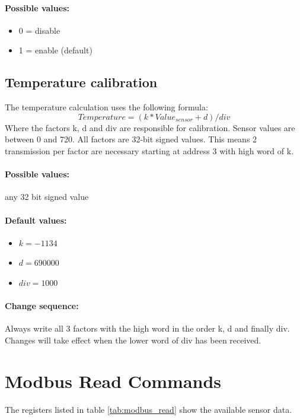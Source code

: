 \paragraph{Possible values:}
\begin{itemize}
    \item 0 = disable
    \item 1 = enable (default)
\end{itemize}

\subsection{Temperature calibration}
The temperature calculation uses the following formula:
\[
Temperature = (k * Value_{sensor} + d) / div
\]
Where the factors k, d and div are responsible for calibration. Sensor values are between 0 and 720. All factors are 32-bit signed values. This means 2 transmission per factor are necessary starting at address 3 with high word of k.

\paragraph{Possible values:} any 32 bit signed value

\paragraph{Default values:}
\begin{itemize}
\item $k = -1134  $
\item $d = 690000 $
\item $div = 1000 $
\end{itemize}

\paragraph{Change sequence:} Always write all 3 factors with the high word in the order k, d and finally div. Changes will take effect when the lower word of div has been received.

\section{Modbus Read Commands}
The registers listed in table \ref{tab:modbus_read} show the available sensor data.

